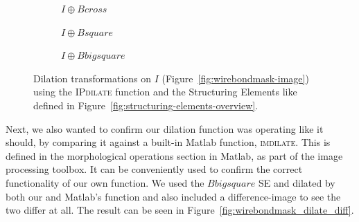 \documentclass{article}
\begin{document}
\begin{figure}[H]
     \centering
     \begin{subfigure}[b]{0.3\textwidth}
         \centering
         
         \caption{$I \oplus Bcross$}
         \label{fig:wirebondmask_Bcross_dilated}
     \end{subfigure}
     \hfill
     \begin{subfigure}[b]{0.3\textwidth}
         \centering
         
         \caption{$I \oplus Bsquare$}
         \label{fig:wirebondmask_Bsquare_dilated}
     \end{subfigure}
     \hfill
     \begin{subfigure}[b]{0.3\textwidth}
         \centering
         
         \caption{$I \oplus Bbigsquare$}
         \label{fig:wirebondmask_Bbigsquare_dilated}
     \end{subfigure}
     
    \caption{Dilation transformations on $I$ (Figure~\ref{fig:wirebondmask-image}) using the \textsc{IPdilate} function and the Structuring Elements like defined in Figure~\ref{fig:structuring-elements-overview}.}
    \label{fig:wirebondmask_dilated}
\end{figure}

Next, we also wanted to confirm our dilation function was operating like it should, by comparing it against a built-in Matlab function, \textsc{imdilate}. This is defined in the morphological operations section in Matlab, as part of the image processing toolbox. It can be conveniently used to confirm the correct functionality of our own function. We used the $Bbigsquare$ SE and dilated by both our and Matlab's function and also included a difference-image to see the two differ at all. The result can be seen in Figure~\ref{fig:wirebondmask_dilate_diff}.
\end{document}
